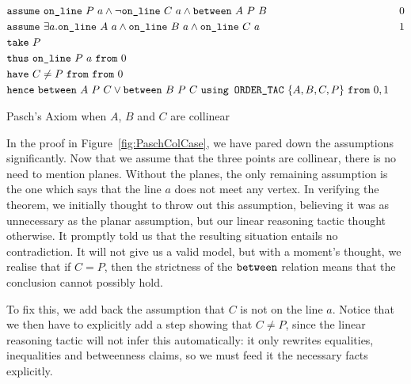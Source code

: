 \begin{boxedfigure}
  \begin{align*}
    & \code{assume}\ \code{on\_line}\ P\ a\wedge\neg\code{on\_line}\ C\ a \wedge \between{A}{P}{B} & 0\\
    & \code{assume}\ \exists a. \code{on\_line}\ A\ a\wedge\code{on\_line}\ B\ a\wedge\code{on\_line}\ C\ a&1\\
    & \code{take}\ P\\
    & \code{thus}\ \code{on\_line}\ P\ a\ \code{from}\ 0\\
    & \code{have}\ C \neq P\ \code{from}\ \code{from}\ 0\\
    & \code{hence}\ \between{A}{P}{C} \vee \between{B}{P}{C}\ \code{using ORDER\_TAC}\ \{A,B,C,P\}\ \code{from}\ 0,1
  \end{align*}
  \caption{Pasch's Axiom when $A$, $B$ and $C$ are collinear}
  \label{fig:PaschColCase}
\end{boxedfigure}

In the proof in Figure~\ref{fig:PaschColCase}, we have pared down the assumptions significantly. Now that we assume that the three points are collinear, there is no need to mention planes. Without the planes, the only remaining assumption is the one which says that the line $a$ does not meet any vertex. In verifying the theorem, we initially thought to throw out this assumption, believing it was as unnecessary as the planar assumption, but our linear reasoning tactic thought otherwise. It promptly told us that the resulting situation entails no contradiction. It will not give us a valid model, but with a moment's thought, we realise that if $C = P$, then the strictness of the $\texttt{between}$ relation means that the conclusion cannot possibly hold.

To fix this, we add back the assumption that $C$ is not on the line $a$. Notice that we then have to explicitly add a step showing that $C \neq P$, since the linear reasoning tactic will not infer this automatically: it only rewrites equalities, inequalities and betweenness claims, so we must feed it the necessary facts explicitly.

